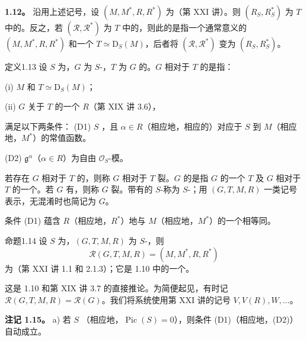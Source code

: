 \textbf{1.12。} 沿用上述记号，设 $(M,M^*,R,R^*)$ 为（第 XXI 讲）。则 $(R_S,R_S^*)$ 为 $T$ 中的。反之，若 $(\mathscr R,\mathscr R^*)$ 为 $T$ 中的，则此的是指一个通常意义的 $(M,M^*,R,R^*)$ 和一个 $T\simeq\mathrm D_S(M)$，后者将 $(\mathscr R,\mathscr R^*)$ 变为 $(R_S,R_S^*)$。
\begin{SGAresult}{定义}{1.13}
设 $S$ 为，$G$ 为 $S$-，$T$ 为 $G$ 的。$G$ 相对于 $T$ 的是指：

(i)  $M$ 和 $T\simeq\mathrm D_S(M)$；

(ii) $G$ 关于 $T$ 的一个 $R$（第 XIX 讲 3.6），

满足以下两条件：
(D1) $S$ ，且 $\alpha\in R$（相应地，相应的）对应于 $S$ 到 $M$（相应地，$M^*$）的常值函数。

(D2) $\mathfrak g^\alpha$（$\alpha\in R$）为自由 $\mathcal O_S$-模。

若存在 $G$ 相对于 $T$ 的，则称 $G$ 相对于 $T$ 裂。$G$ 的是指 $G$ 的一个 $T$ 及 $G$ 相对于 $T$ 的一个。若 $G$ 有，则称 $G$ 裂。带有的 $S$-称为 $S$-；用 $(G,T,M,R)$ 一类记号表示，无混淆时也简记为 $G$。
\end{SGAresult}
条件 (D1) 蕴含 $R$（相应地，$R^*$）地与 $M$（相应地，$M^*$）的一个相等同。
\begin{SGAresult}{命题}{1.14} 设 $S$ 为，$(G,T,M,R)$ 为 $S$-，则
\[\mathcal R(G,T,M,R)=(M,M^*,R,R^*)\]
为（第 XXI 讲 1.1 和 2.1.3）；它是 1.10 中的一个。\end{SGAresult}
这是 1.10 和第 XIX 讲 3.7 的直接推论。为简便起见，有时记 $\mathcal R(G,T,M,R)=\mathcal R(G)$。我们将系统使用第 XXI 讲的记号 $V,V(R),W,\ldots$。

\textbf{注记 1.15。} a) 若 $S$ （相应地，$\operatorname{Pic}(S)=0$），则条件 (D1)（相应地，(D2)）自动成立。


